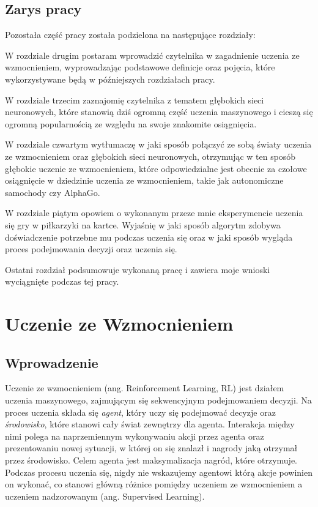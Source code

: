 \documentclass[licencjacka]{pracamgr}
\begin{document}
\section{Zarys pracy}

Pozostała część pracy została podzielona na następujące rozdziały:

W rozdziale drugim postaram wprowadzić czytelnika w zagadnienie uczenia ze wzmocnieniem, wyprowadzając podstawowe definicje oraz pojęcia, które wykorzystywane będą w późniejszych rozdziałach pracy.

W rozdziale trzecim zaznajomię czytelnika z tematem głębokich sieci neuronowych, które stanowią dziś ogromną część uczenia maszynowego i cieszą się ogromną popularnością ze względu na swoje znakomite osiągnięcia.

W rozdziale czwartym wytłumaczę w jaki sposób połączyć ze sobą światy uczenia ze wzmocnieniem oraz głębokich sieci neuronowych, otrzymując w ten sposób głębokie uczenie ze wzmocnieniem, które odpowiedzialne jest obecnie za czołowe osiągnięcie w dziedzinie uczenia ze wzmocnieniem, takie jak autonomiczne samochody czy AlphaGo.

W rozdziale piątym opowiem o wykonanym przeze mnie eksperymencie uczenia się gry w piłkarzyki na kartce. Wyjaśnię w jaki sposób algorytm zdobywa doświadczenie potrzebne mu podczas uczenia się oraz w jaki sposób wygląda proces podejmowania decyzji oraz uczenia się.

Ostatni rozdział podsumowuje wykonaną pracę i zawiera moje wnioski wyciągnięte podczas tej pracy.
 
\chapter{Uczenie ze Wzmocnieniem}\label{r:rl}

\section{Wprowadzenie}

Uczenie ze wzmocnieniem (ang. Reinforcement Learning, RL) jest działem uczenia maszynowego, zajmującym się sekwencyjnym podejmowaniem decyzji. Na proces uczenia składa się \emph{agent}, który uczy się podejmować decyzje oraz \emph{środowisko}, które stanowi cały świat zewnętrzy dla agenta. Interakcja między nimi polega na naprzemiennym wykonywaniu akcji przez agenta oraz prezentowaniu nowej sytuacji, w której on się znalazł i nagrody jaką otrzymał przez środowisko. Celem agenta jest maksymalizacja nagród, które otrzymuje.
Podczas procesu uczenia się, nigdy nie wskazujemy agentowi którą akcje powinien on wykonać, co stanowi główną różnice pomiędzy uczeniem ze wzmocnieniem a uczeniem nadzorowanym (ang. Supervised Learning). 
\end{document}
